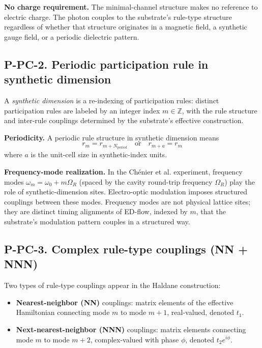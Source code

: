 \documentclass[11pt,a4paper]{article}
\begin{document}
\textbf{No charge requirement.} The minimal-channel structure makes no reference to electric charge. The photon couples to the substrate's rule-type structure regardless of whether that structure originates in a magnetic field, a synthetic gauge field, or a periodic dielectric pattern.

\subsection{P-PC-2. Periodic participation rule in synthetic dimension}

A \emph{synthetic dimension} is a re-indexing of participation rules: distinct participation rules are labeled by an integer index $m \in \mathbb{Z}$, with the rule structure and inter-rule couplings determined by the substrate's effective construction.

\textbf{Periodicity.} A periodic rule structure in synthetic dimension means
\[
r_m = r_{m + N_{\mathrm{period}}} \quad \text{or} \quad r_{m+a} = r_m
\]
where $a$ is the unit-cell size in synthetic-index units.

\textbf{Frequency-mode realization.} In the Ch\'enier et al. experiment, frequency modes $\omega_m = \omega_0 + m\Omega_R$ (spaced by the cavity round-trip frequency $\Omega_R$) play the role of synthetic-dimension sites. Electro-optic modulation imposes structured couplings between these modes. Frequency modes are not physical lattice sites; they are distinct timing alignments of ED-flow, indexed by $m$, that the substrate's modulation pattern couples in a structured way.

\subsection{P-PC-3. Complex rule-type couplings (NN + NNN)}

Two types of rule-type couplings appear in the Haldane construction:

\begin{itemize}[noitemsep]
  \item \textbf{Nearest-neighbor (NN)} couplings: matrix elements of the effective Hamiltonian connecting mode $m$ to mode $m+1$, real-valued, denoted $t_1$.
  \item \textbf{Next-nearest-neighbor (NNN)} couplings: matrix elements connecting mode $m$ to mode $m+2$, complex-valued with phase $\phi$, denoted $t_2 e^{i\phi}$.
\end{itemize}
\end{document}
